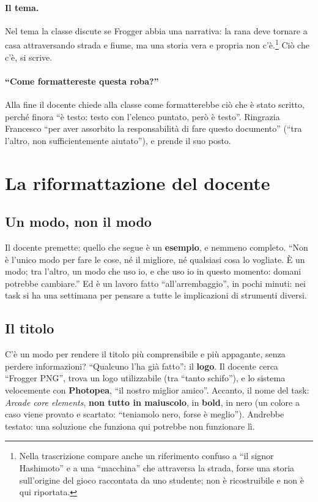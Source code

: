 \paragraph{Il tema.} Nel tema la classe discute se Frogger abbia una
narrativa: la rana deve tornare a casa attraversando strada e fiume, ma una
storia vera e propria non c'è.\footnote{Nella trascrizione compare anche un
riferimento confuso a ``il signor Hashimoto'' e a una ``macchina'' che
attraversa la strada, forse una storia sull'origine del gioco raccontata da
uno studente; non è ricostruibile e non è qui riportata.} Ciò che c'è, si
scrive.

\paragraph{``Come formattereste questa roba?''} Alla fine il docente chiede
alla classe come formatterebbe ciò che è stato scritto, perché finora ``è
testo: testo con l'elenco puntato, però è testo''. Ringrazia Francesco
``per aver assorbito la responsabilità di fare questo documento'' (``tra
l'altro, non sufficientemente aiutato''), e prende il suo posto.

\section{La riformattazione del docente}
\label{gd9:sec:riformattazione}

\subsection{Un modo, non il modo}

Il docente premette: quello che segue è un \textbf{esempio}, e nemmeno
completo. ``Non è l'unico modo per fare le cose, né il migliore, né
qualsiasi cosa lo vogliate. È un modo; tra l'altro, un modo che uso io, e che
uso io in questo momento: domani potrebbe cambiare.'' Ed è un lavoro fatto
``all'arrembaggio'', in pochi minuti: nei task si ha una settimana per
pensare a tutte le implicazioni di strumenti diversi.

\subsection{Il titolo}

C'è un modo per rendere il titolo più comprensibile e più appagante, senza
perdere informazioni? ``Qualcuno l'ha già fatto'': il \textbf{logo}. Il
docente cerca ``Frogger PNG'', trova un logo utilizzabile (tra ``tanto
schifo''), e lo sistema velocemente con \textbf{Photopea}, ``il nostro miglior
amico''. Accanto, il nome del task: \emph{Arcade core elements},
\textbf{non tutto in maiuscolo}, in \textbf{bold}, in nero (un colore a caso
viene provato e scartato: ``teniamolo nero, forse è meglio''). Andrebbe
testato: una soluzione che funziona qui potrebbe non funzionare lì.

